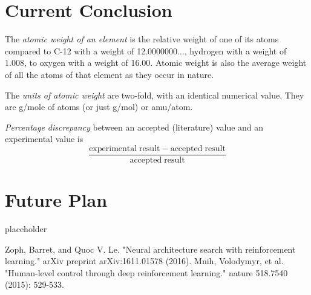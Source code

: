 \documentclass[14pt]{extarticle}
\begin{document}

\section{Current Conclusion}

\begin{enumerate}
\begin{item}
The \emph{atomic weight of an element} is the relative weight of one of its atoms compared to C-12 with a weight of 12.0000000$\ldots$, hydrogen with a weight of 1.008, to oxygen with a weight of 16.00. Atomic weight is also the average weight of all the atoms of that element as they occur in nature.
\end{item}
\begin{item}
The \emph{units of atomic weight} are two-fold, with an identical numerical value. They are g/mole of atoms (or just g/mol) or amu/atom.
\end{item}
\begin{item}
\emph{Percentage discrepancy} between an accepted (literature) value and an experimental value is
\begin{equation*}
\frac{\mathrm{experimental\;result} - \mathrm{accepted\;result}}{\mathrm{accepted\;result}}
\end{equation*}
\end{item}
\end{enumerate}


\section{Future Plan}

placeholder




\begin{thebibliography}{99}  
    Zoph, Barret, and Quoc V. Le. "Neural architecture search with reinforcement learning." arXiv preprint arXiv:1611.01578 (2016).
    Mnih, Volodymyr, et al. "Human-level control through deep reinforcement learning." nature 518.7540 (2015): 529-533.
\end{thebibliography}
\end{document}
